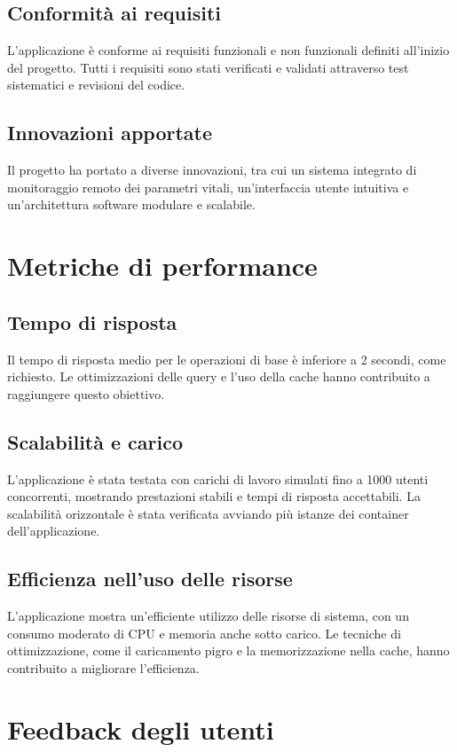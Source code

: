 \documentclass[12pt,a4paper,oneside]{report}
\begin{document}
\subsection{Conformità ai requisiti}
L'applicazione è conforme ai requisiti funzionali e non funzionali definiti all'inizio del progetto. Tutti i requisiti sono stati verificati e validati attraverso test sistematici e revisioni del codice.

\subsection{Innovazioni apportate}
Il progetto ha portato a diverse innovazioni, tra cui un sistema integrato di monitoraggio remoto dei parametri vitali, un'interfaccia utente intuitiva e un'architettura software modulare e scalabile.

\section{Metriche di performance}
\subsection{Tempo di risposta}
Il tempo di risposta medio per le operazioni di base è inferiore a 2 secondi, come richiesto. Le ottimizzazioni delle query e l'uso della cache hanno contribuito a raggiungere questo obiettivo.

\subsection{Scalabilità e carico}
L'applicazione è stata testata con carichi di lavoro simulati fino a 1000 utenti concorrenti, mostrando prestazioni stabili e tempi di risposta accettabili. La scalabilità orizzontale è stata verificata avviando più istanze dei container dell'applicazione.

\subsection{Efficienza nell'uso delle risorse}
L'applicazione mostra un'efficiente utilizzo delle risorse di sistema, con un consumo moderato di CPU e memoria anche sotto carico. Le tecniche di ottimizzazione, come il caricamento pigro e la memorizzazione nella cache, hanno contribuito a migliorare l'efficienza.

\section{Feedback degli utenti}
\end{document}

